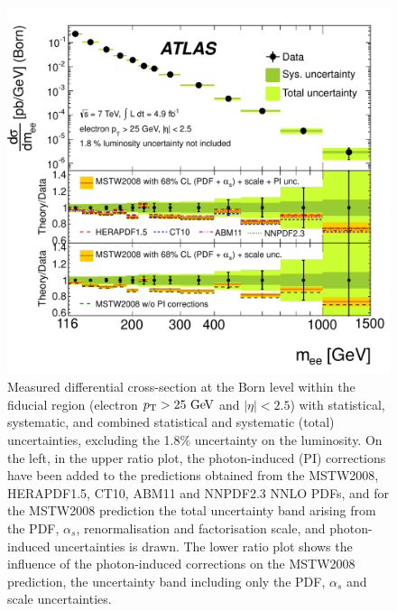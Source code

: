 \begin{figure}[p]
    \centering
    \includegraphics[height=0.3\textheight]{figures/ss-inclboson-drellyan-atlas7tev}
    \caption{Measured differential cross-section at the Born level within the
    fiducial region (electron $\pt > 25 \GeV$ and $|\eta| < 2.5$) with statistical,
     systematic, and combined statistical and systematic (total) uncertainties,
     excluding the 1.8\% uncertainty on the luminosity.
      On the left, in the upper ratio plot, the photon-induced (PI)
     corrections have been added to the predictions obtained from the MSTW2008,
     HERAPDF1.5, CT10, ABM11 and NNPDF2.3 NNLO PDFs, and for the MSTW2008 prediction
     the total uncertainty band arising from the PDF, $\alpha_s$, renormalisation
     and factorisation scale, and photon-induced uncertainties is drawn. The lower
     ratio plot shows the influence of the photon-induced corrections on the
     MSTW2008 prediction, the uncertainty band including only the PDF, $\alpha_s$
     and scale uncertainties.}
    \label{fig:ss-inclboson-drellyan-atlas7tev}
\end{figure}

